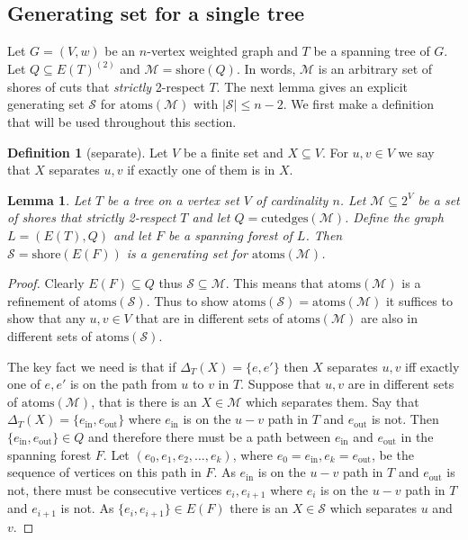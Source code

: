 \documentclass[10pt,a4paper]{article}
\newcommand{\Mcal}{\mathcal{M}}
\newcommand{\Scal}{\mathcal{S}}
\newcommand{\atoms}{\mathrm{atoms}}
\newcommand{\rmin}{\mathrm{in}}
\newcommand{\rmout}{\mathrm{out}}
\newcommand{\shore}{\mathrm{shore}}
\newcommand{\edges}{\mathrm{cutedges}}
\newcommand{\1}{\mathbf{1}}
\newtheorem{lemma}[theorem]{Lemma}
\theoremstyle{definition}
\newtheorem{definition}[theorem]{Definition}
\begin{document}
\subsection{Generating set for a single tree} \label{sec:single-tree}
Let $G = (V,w)$ be an $n$-vertex weighted graph and $T$ be a spanning tree of $G$.  Let $Q \subseteq E(T)^{(2)}$ and 
$\Mcal = \shore(Q)$.  In words, $\Mcal$ is an arbitrary set of shores of cuts that \emph{strictly} 2-respect $T$.  
The next lemma gives an explicit generating set $\Scal$ for $\atoms(\Mcal)$ with $|\Scal| \le n-2$.  We first make a definition
that will be used throughout this section.

\begin{definition}[separate]
Let $V$ be a finite set and $X \subseteq V$.  For $u,v \in V$ we say that $X$ separates $u,v$ if exactly one of 
them is in $X$.
\end{definition}

\begin{lemma}
\label{lem:spanning}
Let $T$ be a tree on a vertex set $V$ of cardinality $n$.  Let $\Mcal \subseteq 2^V$ be a set of shores that strictly 2-respect $T$ and let 
$Q = \edges(\Mcal)$.  Define the graph $L = (E(T), Q)$ and let $F$ be a spanning forest of $L$.  
Then $\Scal = \shore(E(F))$ is a generating set for $\atoms(\Mcal)$.
\end{lemma}

\begin{proof}
Clearly $E(F) \subseteq Q$ thus $\Scal \subseteq \Mcal$.  This means that $\atoms(\Mcal)$ is a refinement of $\atoms(\Scal)$.  
Thus to show $\atoms(\Scal) = \atoms(\Mcal)$ it suffices to show that any $u,v \in V$ that are in different sets of $\atoms(\Mcal)$ are also in 
different sets of $\atoms(\Scal)$.  
 
The key fact we need is that if $\Delta_T(X) = \{e,e'\}$ then $X$ separates $u,v$ iff exactly one of $e,e'$ is on the 
path from $u$ to $v$ in $T$.  Suppose that $u,v$ are in different sets of $\atoms(\Mcal)$, that is there is an $X \in \Mcal$ 
which separates them.  Say that $\Delta_T(X) = \{e_\rmin,e_\rmout\}$ where $e_\rmin$ is on the $u-v$ path in 
$T$ and $e_\rmout$ is not.  Then $\{e_\rmin,e_\rmout\} \in Q$ and therefore there must be a path between $e_\rmin$ and $e_\rmout$ in the spanning forest 
$F$.  Let $(e_0,e_1, e_2, \ldots, e_k)$, where $e_0 = e_\rmin, e_k = e_\rmout$, be the sequence of vertices on this path in $F$.  As $e_\rmin$ is on the $u-v$ path in $T$ and $e_\rmout$ is 
not, there must be consecutive vertices $e_i,e_{i+1}$ where $e_i$ is on the $u-v$ path in $T$ and $e_{i+1}$ is not.  As $\{e_i, e_{i+1}\} \in E(F)$ there is 
an $X \in \Scal$ which separates $u$ and $v$.  
\end{proof}
\end{document}
